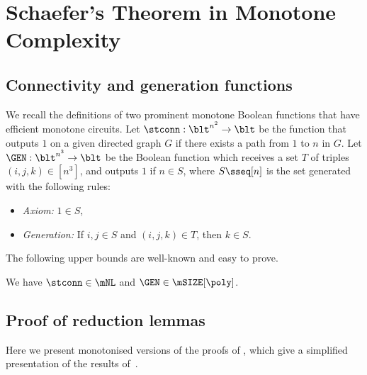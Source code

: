 \documentclass[11pt]{article}
\begin{document}
\section{Schaefer's Theorem in Monotone Complexity}
\label{sec:schaefer_proof}

\subsection{Connectivity and generation functions}

We recall the definitions of two prominent monotone Boolean functions
that have efficient monotone circuits.
Let $\stconn : \blt^{n^2} \to \blt$
be the function that outputs $1$ on a given directed graph $G$
if there exists a path from $1$ to $n$ in $G$.
Let $\GEN : \blt^{n^3} \to \blt$
be the Boolean function which receives a set $T$ of triples 
$(i,j,k) \in [n^3]$,
and outputs $1$ if 
$n \in S$, where $S \sseq [n]$ is the 
set generated with the following rules:

\begin{itemize}
    \item \emph{Axiom:} $1 \in S$,
    \item \emph{Generation:} If $i,j \in S$ and $(i,j,k) \in T$, then
        $k \in S$.
\end{itemize}

The following upper bounds are well-known and easy to prove.

\begin{theorem}
    \label{thm:stconn-gen}
    We have $\stconn \in \mNL$ and
    $\GEN \in \mSIZE[\poly]$.
\end{theorem}

\subsection{Proof of reduction lemmas}
\label{sec:reduction_monotone}

Here we present monotonised versions of the proofs of
\cite[Propositions 2.2 - 2.4]{playing_two},
which give a simplified presentation of the results
of~\cite{DBLP:conf/stoc/Schaefer78}.


\inclcoq*
\end{document}
